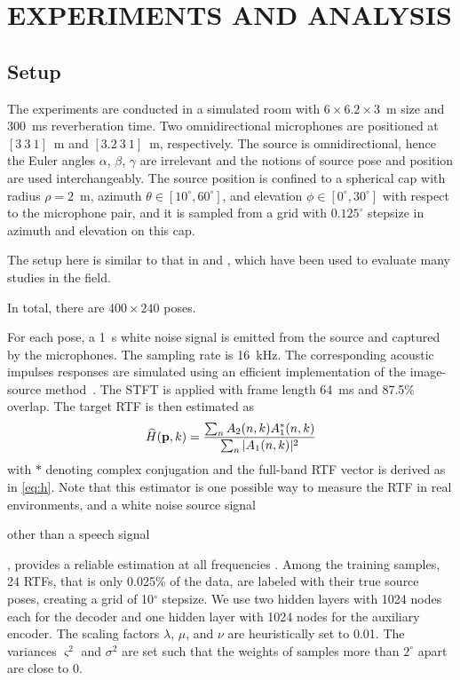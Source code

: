 \documentclass{article}
\newif\ifproofread
\newcommand{\pfmarker}[1]{%
\ifproofread
\textcolor{red}{#1}%
\else
#1%
\fi
}
\begin{document}
\section{EXPERIMENTS AND ANALYSIS}
\label{sec:expe}
\subsection{Setup}


The experiments are conducted in a simulated room with $6\times 6.2\times 3$~m size and 300~ms reverberation time. Two omnidirectional microphones are positioned at $[3~3~1]$~m and $[3.2~3~1]$~m, respectively. The source is omnidirectional, hence the Euler angles $\alpha$, $\beta$, $\gamma$ are irrelevant and the notions of source pose and position are used interchangeably. The source position is confined to a spherical cap with radius $\rho=2$~m, azimuth $\theta \in [10^{\circ},60^{\circ}]$, and elevation $\phi \in [0^{\circ},30^{\circ}]$ with respect to the microphone pair, and it is sampled from a grid with $0.125^\circ$ stepsize in azimuth and elevation on this cap. \pfmarker{The setup here is similar to that in \cite{laufer2016mr} and \cite{deleforge2015acoustic}, which have been used to evaluate many studies in the field.} In total, there are $400\times 240$ poses.

For each pose, a 1~s white noise signal is emitted from the source and captured by the microphones. The sampling rate is 16~kHz. The corresponding acoustic impulses responses are simulated using an efficient implementation of the image-source method~\cite{rirge}. The STFT is applied with frame length 64~ms and 87.5\% overlap. The target RTF is then estimated as
\begin{equation}
\widehat{H}({\bf p}, k)=\frac{\sum_n A_2(n, k)A_1^*(n, k)}{\sum_n |A_1(n, k)|^2}
\end{equation}
with $*$ denoting complex conjugation and the full-band RTF vector is derived as in \eqref{eq:h}. Note that this estimator is one possible way to measure the RTF in real environments, and a white noise source signal \pfmarker{other than a speech signal}, provides a reliable estimation at all frequencies \cite{deleforge2015acoustic}. Among the training samples, 24 RTFs, that is only 0.025\% of the data, are labeled with their true source poses, creating a grid of 10$^\circ$ stepsize. We use two hidden layers with 1024 nodes each for the decoder and one hidden layer with 1024 nodes for the auxiliary encoder. The scaling factors $\lambda$, $\mu$, and $\nu$ are heuristically set to 0.01. The variances $\varsigma^2$ and $\sigma^2$ are set such that the weights of samples more than $2^\circ$ apart are close to 0.
\end{document}
